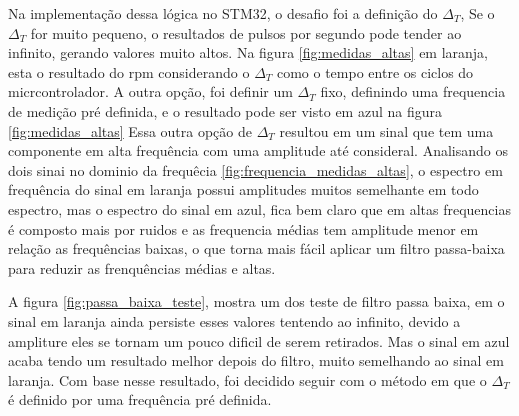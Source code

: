 


Na implementação dessa lógica no STM32, o desafio foi a definição do $\Delta_{T}$,
Se o $\Delta_{T}$ for muito pequeno, o resultados de pulsos por segundo pode tender ao infinito, gerando valores muito altos.
Na figura \ref{fig:medidas_altas} em laranja, esta o resultado do rpm considerando o $\Delta_{T}$ como o tempo entre os ciclos do micrcontrolador.
A outra opção, foi definir um $\Delta_{T}$ fixo, definindo uma frequencia de medição pré definida, e o resultado pode ser visto em azul na figura \ref{fig:medidas_altas}
Essa outra opção de $\Delta_{T}$ resultou em um sinal que tem uma componente em alta frequência com uma amplitude até consideral.
Analisando os dois sinai no dominio da frequêcia \ref{fig:frequencia_medidas_altas}, o espectro em frequência do sinal em laranja possui amplitudes muitos semelhante em todo espectro, mas o espectro do sinal em azul, fica bem claro que em altas frequencias é composto mais por ruidos
e as frequencia médias tem amplitude menor em relação as frequências baixas, o que torna mais fácil aplicar um filtro passa-baixa para reduzir as frenquências médias e altas.

A figura \ref{fig:passa_baixa_teste}, mostra um dos teste de filtro passa baixa, em o sinal em laranja ainda persiste esses valores tentendo ao infinito, devido a ampliture eles se tornam um pouco dificil de serem retirados.
Mas o sinal em azul acaba tendo um resultado melhor depois do filtro, muito semelhando ao sinal em laranja.
Com base nesse resultado, foi decidido seguir com o método em que o $\Delta_{T}$ é definido por uma frequência pré definida.



